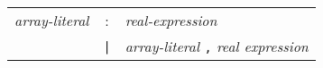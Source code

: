 \begin{tabular}{p{4cm}cl}
\textit{array-literal}
  &:& \textit{real-expression} \\
  &\texttt{|}& \textit{array-literal} \texttt{,} \textit{real expression}
\end{tabular}
